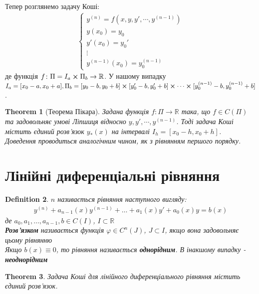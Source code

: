 \documentclass[a4paper, 10pt]{article}
\theoremstyle{theoremdd}
\newtheorem{theorem}{Theorem}[subsection]
\theoremstyle{theoremdd}
\newtheorem{definition}[theorem]{Definition}
\theoremstyle{theoremdd}
\theoremstyle{theoremdd}
\theoremstyle{theoremdd}
\theoremstyle{theoremdd}
\theoremstyle{theoremdd}
\theoremstyle{theoremdd}
\begin{document}
	Тепер розглянемо задачу Коші:
	\begin{align*}
	\begin{cases}
	\displaystyle y^{(n)} = f(x,y,y',\cdots,y^{(n-1)})\\
	y(x_0)=y_0\\
	y'(x_0) = y_0'\\
	\vdots \\
	y^{(n-1)}(x_0) = y_0^{(n-1)}
	\end{cases}
	\end{align*}
	де функція $f\colon \Pi = I_a \cross \Pi_b \to \mathbb{R}$. У нашому випадку $I_a = [x_0 - a, x_0 + a], \\ \Pi_b = [y_0 -b, y_0+b] \cross [y_0'-b,y_0'+b] \cross \cdots \cross [y_0^{(n-1)}-b, y_0^{(n-1)}+b]$.
	
	\begin{theorem}[Теорема Пікара]
	Задана функція $f\colon \Pi \to \mathbb{R}$ така, що $f \in C(\Pi)$ та задовольняє умові Ліпшиця відносно $y,y',\cdots,y^{(n-1)}$. Тоді задача Коші містить єдиний розв'язок $y_*(x)$ на інтервалі $I_h = [x_0-h, x_0+h]$.\\
	\textit{Доведення проводиться аналогічним чином, як з рівнянням першого порядку.}
	\end{theorem}
	\newpage
	
	\section{Лінійні диференціальні рівняння}
	\begin{definition}
 $n$ називається рівняння наступного вигляду:
	\begin{align*}
	y^{(n)} + a_{n-1}(x)y^{(n-1)}+\dots+a_1(x)y'+a_0(x)y=b(x)
	\end{align*}
	де $a_0, a_1,\dots,a_{n-1},b \in C(I)$, $I \subset \mathbb{R}$\\
	\textbf{Розв'язком} називається функція $\varphi \in C^{n}(J)$, $J \subset I$, якщо вона задовольняє цьому рівнянню\\
	Якщо $b(x) \equiv 0$, то рівняння називається \textbf{однорідним}. В інакшому випадку - \textbf{неоднорідним}
	\end{definition}
	
	\begin{theorem}
 Задача Коші для лінійного диференціального рівняння містить єдиний розв'язок.
 	\end{theorem}
 	
\end{document}
